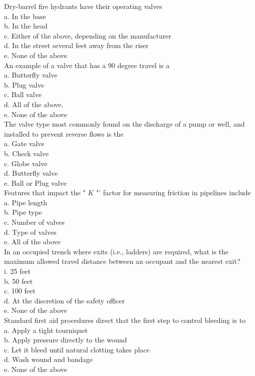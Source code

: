 Dry-barrel fire hydrants have their operating valves\\
a. In the base\\
b. In the head\\
c. Either of the above, depending on the manufacturer\\
d. In the street several feet away from the riser\\
e. None of the above\\

An example of a valve that has a 90 degree travel is a\\
a. Butterfly valve\\
b. Plug valve\\
c. Ball valve\\
d. All of the above.\\
e. None of the above\\

The valve type most commonly found on the discharge of a pump or well, and installed to prevent reverse flows is the\\
a. Gate valve\\
b. Check valve\\
c. Globe valve\\
d. Butterfly valve\\
e. Ball or Plug valve\\

Features that impact the " $K$ "' factor for measuring friction in pipelines include\\
a. Pipe length\\
b. Pipe type\\
c. Number of valves\\
d. Type of valves\\
e. All of the above\\

In an occupied trench where exits (i.e., ladders) are required, what is the maximum allowed travel distance between an occupant and the nearest exit?\\
i. 25 feet\\
b. 50 feet\\
c. 100 feet\\
d. At the discretion of the safety officer\\
e. None of the above\\

Standard first aid procedures direct that the first step to control bleeding is to\\
a. Apply a tight tourniquet\\
b. Apply pressure directly to the wound\\
c. Let it bleed until natural clotting takes place\\
d. Wash wound and bandage\\
e. None of the above\\

